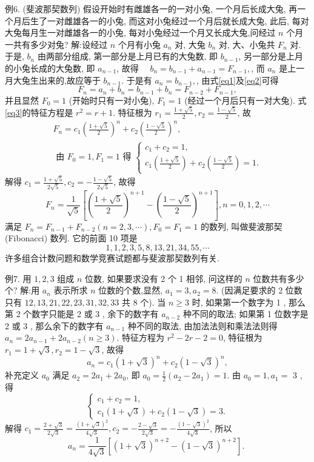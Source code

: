 例6. (斐波那契数列) 假设开始时有雌雄各一的一对小兔, 一个月后长成大兔, 再一个月后生了一对雌雄各一的小兔, 而这对小兔经过一个月后就长成大兔, 此后, 每对大兔每月生一对雌雄各一的小兔, 每对小兔经过一个月又长成大兔,问经过 $n$ 个月一共有多少对兔?
解:设经过 $n$ 个月有小兔 $a_n$ 对, 大兔 $b_n$ 对, 大、小兔共 $F_n$ 对.
于是, $b_n$ 由两部分组成, 第一部分是上月已有的大兔数, 即 $b_{n-1}$, 另一部分是上月的小兔长成的大兔数, 即 $a_{n-1}$, 故得 $\quad b_n=b_{n-1}+a_{n-1}=F_{n-1}, \label{eq1}$, 
而 $a_n$ 是上一月大兔生出来的,故应等于 $b_{n-1}$. 于是有 $a_n=b_{n-1}, \label{eq2}$, 
由式\ref{eq1}及\ref{eq2}可得
$$
F_n=a_n+b_n=b_{n-1}+b_n=F_{n-2}+F_{n-1}, \label{eq3}
$$
并且显然 $F_0=1$ (开始时只有一对小兔), $F_1=1$ (经过一个月后只有一对大兔). 式\ref{eq3}的特征方程是 $r^2=r+1$. 特征根为 $r_1=\frac{1+\sqrt{5}}{2}, r_2=\frac{1-\sqrt{5}}{2}$, 故
$$
\begin{array}{r}
F_n=c_1\left(\frac{1+\sqrt{5}}{2}\right)^n+c_2\left(\frac{1-\sqrt{5}}{2}\right)^n, \\
\text { 由 } F_0=1, F_1=1 \text { 得 }\left\{\begin{array}{l}
c_1+c_2=1, \\
c_1\left(\frac{1+\sqrt{5}}{2}\right)+c_2\left(\frac{1-\sqrt{5}}{2}\right)=1 .
\end{array}\right.
\end{array}
$$
解得 $c_1=\frac{1+\sqrt{5}}{2 \sqrt{5}}, c_2=-\frac{1-\sqrt{5}}{2 \sqrt{5}}$, 故得
$$
F_n=\frac{1}{\sqrt{5}}\left[\left(\frac{1+\sqrt{5}}{2}\right)^{n+1}-\left(\frac{1-\sqrt{5}}{2}\right)^{n+1}\right], n=0,1,2, \cdots
$$
满足 $F_n=F_{n-1}+F_{n-2}(n=2,3, \cdots), F_0=F_1=1$ 的数列, 叫做斐波那契 (Fibonacci) 数列.
它的前面 10 项是
$$
1,1,2,3,5,8,13,21,34,55, \cdots
$$
许多组合计数问题和数学竞赛试题都与斐波那契数列有关.



例7. 用 $1,2,3$ 组成 $n$ 位数, 如果要求没有 2 个 1 相邻, 问这样的 $n$ 位数共有多少个?
解:用 $a_n$ 表示所求 $n$ 位数的个数,显然, $a_1=3, a_2=8$. (因满足要求的 2 位数只有 $12,13,21,22,23,31,32,33$ 共 8 个). 当 $n \geqslant 3$ 时, 如果第一个数字为 1 , 那么第 2 个数字只能是 2 或 3 , 余下的数字有 $a_{n-2}$ 种不同的取法; 如果第 1 位数字是 2 或 3 , 那么余下的数字有 $a_{n-1}$ 种不同的取法, 由加法法则和乘法法则得 $a_n=2 a_{n-1}+2 a_{n-2}(n \geqslant 3)$. 特征方程为 $r^2-2 r-2=0$, 特征根为 $r_1=1+\sqrt{3}, r_2=1-\sqrt{3}$, 故得
$$
a_n=c_1(1+\sqrt{3})^n+c_2(1-\sqrt{3})^n,
$$
补充定义 $a_0$ 满足 $a_2=2 a_1+2 a_0$, 即 $a_0=\frac{1}{2}\left(a_2-2 a_1\right)=1$. 由 $a_0=1, a_1=$ 3 , 得
$$
\left\{\begin{array}{l}
c_1+c_2=1, \\
c_1(1+\sqrt{3})+c_2(1-\sqrt{3})=3 .
\end{array}\right.
$$
解得 $c_1=\frac{2+\sqrt{3}}{2 \sqrt{3}}=\frac{(1+\sqrt{3})^2}{4 \sqrt{3}}, c_2=-\frac{2-\sqrt{3}}{2 \sqrt{3}}=-\frac{(1-\sqrt{3})^2}{4 \sqrt{3}}$, 所以
$$
a_n=\frac{1}{4 \sqrt{3}}\left[(1+\sqrt{3})^{n+2}-(1-\sqrt{3})^{n+2}\right] \text {. }
$$



